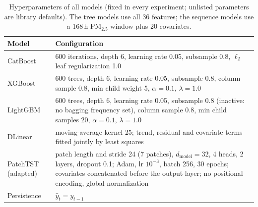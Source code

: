 \begin{table}[!htbp]
\centering\small
\caption{Hyperparameters of all models (fixed in every experiment; unlisted parameters are library defaults). The tree models use all 36 features; the sequence models use a 168\,h PM$_{2.5}$ window plus 20 covariates.}
\label{tab:app-hyper}
\begin{tabular}{lp{}}
\toprule
Model & Configuration \\
\midrule
CatBoost & 600 iterations, depth 6, learning rate 0.05, subsample 0.8, $\ell_2$ leaf regularization 1.0 \\
XGBoost & 600 trees, depth 6, learning rate 0.05, subsample 0.8, column sample 0.8, min child weight 5, $\alpha=0.1$, $\lambda=1.0$ \\
LightGBM & 600 trees, depth 6, learning rate 0.05, subsample 0.8 (inactive: no bagging frequency set), column sample 0.8, min child samples 20, $\alpha=0.1$, $\lambda=1.0$ \\
DLinear & moving-average kernel 25; trend, residual and covariate terms fitted jointly by least squares \\
PatchTST (adapted) & patch length and stride 24 (7 patches), $d_{\text{model}}=32$, 4 heads, 2 layers, dropout 0.1; Adam, lr $10^{-3}$, batch 256, 30 epochs; covariates concatenated before the output layer; no positional encoding, global normalization \\
Persistence & $\hat y_t = y_{t-1}$ \\
\bottomrule
\end{tabular}
\end{table}
